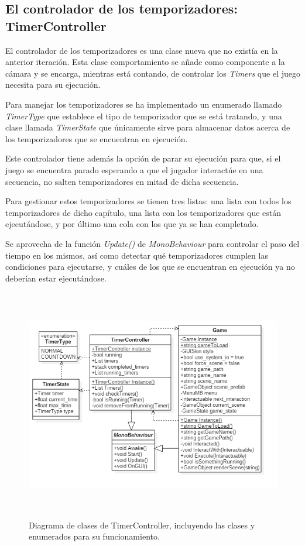 \subsection{El controlador de los temporizadores: TimerController}
\label{timercontrollersecit2}

El controlador de los temporizadores es una clase nueva que no existía en la anterior iteración. Esta clase comportamiento se añade como componente a la cámara y se encarga, mientras está contando, de controlar los \textit{Timers} que el juego necesita para su ejecución.

Para manejar los temporizadores se ha implementado un enumerado llamado \textit{TimerType} que establece el tipo de temporizador que se está tratando, y una clase llamada \textit{TimerState} que únicamente sirve para almacenar datos acerca de los temporizadores que se encuentran en ejecución.

Este controlador tiene además la opción de parar su ejecución para que, si el juego se encuentra parado esperando a que el jugador interactúe en una secuencia, no salten temporizadores en mitad de dicha secuencia. 

Para gestionar estos temporizadores se tienen tres listas:  una lista con todos los temporizadores de dicho capítulo, una lista con los temporizadores que están ejecutándose, y por último una cola con los que ya se han completado.

Se aprovecha de la función \textit{Update()} de \textit{MonoBehaviour} para controlar el paso del tiempo en los mismos, así como detectar qué temporizadores cumplen las condiciones para ejecutarse, y cuáles de los que se encuentran en ejecución ya no deberían estar ejecutándose.

\begin{figure}[h!]
	\centerline{\includegraphics[height=4in]{figures/it2/TimerController.png}}
	\caption[TimerController - Versión Final]{Diagrama de clases de TimerController, incluyendo las clases y enumerados para su funcionamiento.}
	\label{timercontrollerit2}
\end{figure}

